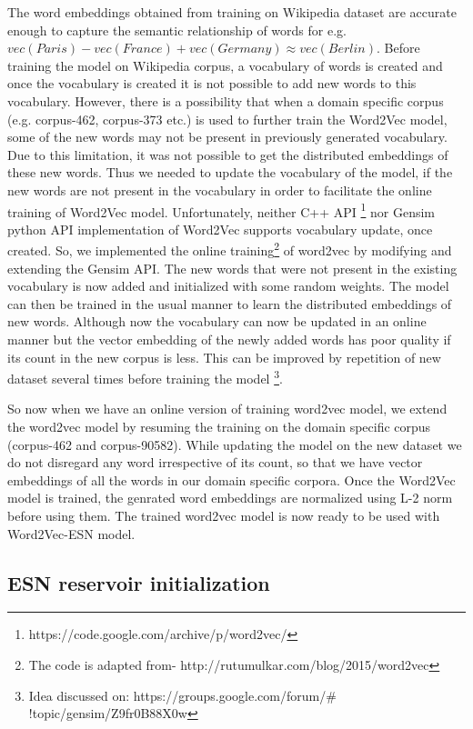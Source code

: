 The word embeddings obtained from training on Wikipedia dataset are accurate enough to capture the semantic relationship of words for e.g. $vec(Paris) -vec(France) + vec(Germany) \approx vec(Berlin)$. Before training the model on Wikipedia corpus, a vocabulary of words is created and once the vocabulary is created it is not possible to add new words to this vocabulary. However, there is a possibility that when a domain specific corpus (e.g. corpus-462, corpus-373 etc.) is used to further train the Word2Vec model, some of the new words may not be present in previously generated vocabulary. Due to this limitation, it was not possible to get the distributed embeddings of these new words. Thus we needed to update the vocabulary of the model, if the new words are not present in the vocabulary in order to facilitate the online training of Word2Vec model. Unfortunately, neither C++ API \footnote{https://code.google.com/archive/p/word2vec/} nor Gensim python API \cite{w2v:gensim_api} implementation of Word2Vec supports vocabulary update, once created. So, we implemented the online training\footnote{The code is adapted from-  http://rutumulkar.com/blog/2015/word2vec} of word2vec by modifying and extending the Gensim API. The new words that were not present in the existing vocabulary is now added and initialized with some random weights. The model can then be trained in the usual manner to learn the distributed  embeddings of new words. Although now the vocabulary can now be updated in an online manner but the vector embedding of the newly added words has poor quality if its count in the new corpus is less. This can be improved by repetition of new dataset several times before training the model \footnote{Idea discussed on: https://groups.google.com/forum/$\#$!topic/gensim/Z9fr0B88X0w}.

So now when we have an online version of training word2vec model, we extend the word2vec model by resuming the training on the domain specific corpus (corpus-462 and corpus-90582). While updating the model on the new dataset we do not disregard any word irrespective of its count, so that we have vector embeddings of all the words in our domain specific corpora. Once the Word2Vec model is trained, the genrated word embeddings are normalized using L-2 norm before using them. The trained word2vec model is now ready to be used with Word2Vec-ESN model.

\subsection{ESN reservoir initialization}

